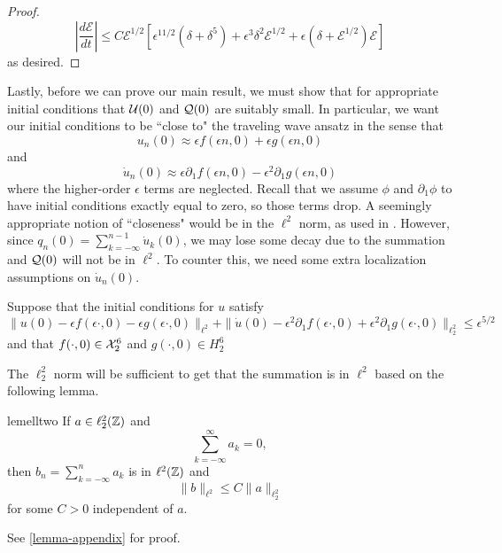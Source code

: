 \begin{proof}
	\begin{equation*}
		\left|\frac{d\mathcal E}{dt} \right| \leq C \mathcal E^{1/2}\left[ \epsilon^{11/2} (\delta + \delta^5)  + \epsilon^3\delta^2\mathcal E^{1/2} + \epsilon(\delta + \mathcal{E}^{1/2})\mathcal E\right]
	\end{equation*}
	as desired.
\end{proof}


Lastly, before we can prove our main result, we must show that for appropriate initial conditions that \(\mathcal{U}(0)\) and \(\mathcal{Q}(0)\) are suitably small. In particular, we want our initial conditions to be ``close to" the traveling wave ansatz in the sense that 
\begin{equation*}
	u_n(0) \approx \epsilon f(\epsilon n , 0) + \epsilon g(\epsilon n , 0)
\end{equation*}
and 
\begin{equation*}
	\dot u_n(0) \approx \epsilon \partial_1 f(\epsilon n , 0) -\epsilon^2 \partial_ 1 g(\epsilon n,0)
\end{equation*}
where the higher-order \(\epsilon\) terms are neglected. Recall that we assume \(\phi\) and \(\partial_1\phi\) to have initial conditions exactly equal to zero, so those terms drop. A seemingly appropriate notion of ``closeness" would be in the \(\ell^2\) norm, as used in \cite{khan2017long,schneider2000counter}. However, since \(q_n(0) = \sum_{k=-\infty}^{n-1} \dot u_{k}(0)\), we may lose some decay due to the summation and \(\mathcal{Q}(0)\) will not be in \(\ell^2\). To counter this, we need some extra localization assumptions on \(\dot u_n(0)\).

\begin{assum}\label{assumption-3}
	Suppose that the initial conditions for \(u\) satisfy
	\begin{equation*}
		\| u(0) - \epsilon f(\epsilon \cdot, 0) - \epsilon g(\epsilon \cdot, 0) \|_{\ell^2} + \| \dot u(0) - \epsilon^2 \partial_1 f(\epsilon \cdot, 0) + \epsilon^2 \partial_1 g (\epsilon \cdot , 0) \|_{\ell^2_2} \leq \epsilon^{5/2}
	\end{equation*}
	and that \(f(\cdot, 0) \in \mathcal{X}^6_2\) and \(g(\cdot, 0) \in H^6_2\)
\end{assum}

The \(\ell^2_2\) norm will be sufficient to get that the summation is in \(\ell^2\) based on the following lemma.
\begin{restatable}{lem}{elltwo}
\label{ell22-lemma}
	If \(a\in \ell^2_2(\mathbb{Z})\) and 
	\begin{equation*}
		\sum_{k=-\infty}^\infty a_k = 0,
	\end{equation*}
	then \(b_n = \sum_{k=-\infty}^n a_k\) is in \(\ell^2(\mathbb{Z})\) and 
	\begin{equation*}
		\|b\|_{\ell^2} \leq C \|a\|_{\ell^2_2}
	\end{equation*}
	for some \(C> 0\) independent of \(a\).
\end{restatable} 
See \cref{lemma-appendix} for proof.


